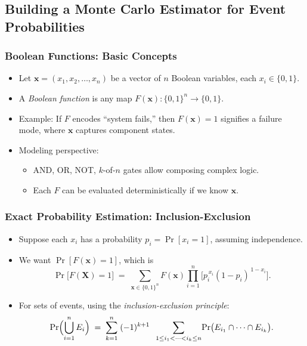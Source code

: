\subsection{Building a Monte Carlo Estimator for Event Probabilities}
\begin{frame}[t, allowframebreaks]
\frametitle{Boolean Functions: Basic Concepts}
\begin{itemize}
  \item Let \(\mathbf{x} = (x_1, x_2, \dots, x_n)\) be a vector of \(n\) Boolean variables, each \(x_i \in \{0,1\}\).
  \item A \emph{Boolean function} is any map \(F(\mathbf{x}): \{0,1\}^n \to \{0,1\}\).
  \item Example: If \(F\) encodes “system fails,” then \(F(\mathbf{x}) = 1\) signifies a failure mode, where \(\mathbf{x}\) captures component states.
  \item Modeling perspective:
    \begin{itemize}
      \item AND, OR, NOT, \(k\)-of-\(n\) gates allow composing complex logic.  
      \item Each \(F\) can be evaluated deterministically if we know \(\mathbf{x}\).
    \end{itemize}
\end{itemize}
\end{frame}

\begin{frame}[t, allowframebreaks]
\frametitle{Exact Probability Estimation: Inclusion-Exclusion}
\begin{itemize}
  \item Suppose each \(x_i\) has a probability \(p_i = \Pr[x_i=1]\), assuming independence.
  \item We want \(\Pr[F(\mathbf{x}) = 1]\), which is
  \[
    \Pr\bigl[F(\mathbf{X})=1\bigr]
    \;=\; 
    \sum_{\mathbf{x}\in \{0,1\}^n}
      F(\mathbf{x}) 
      \prod_{i=1}^n
      \bigl[p_i^{\,x_i}(1-p_i)^{\,1-x_i}\bigr].
  \]
  \item For sets of events, using the \emph{inclusion-exclusion principle}:
  \[
    \Pr\Bigl(\bigcup_{i=1}^n E_i\Bigr)
    \;=\;
    \sum_{k=1}^n \;(-1)^{k+1} 
    \;\;\sum_{1\le i_1< \cdots < i_k\le n}
    \!\Pr\bigl(E_{i_1}\cap\dots\cap E_{i_k}\bigr).
  \]

\end{itemize}
\end{frame}

